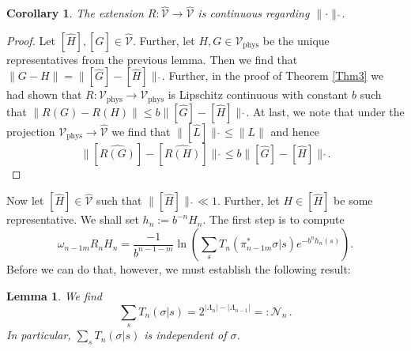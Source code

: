 \documentclass{article}
\newtheorem{lemma}[theorem]{Lemma}
\newtheorem{corollary}[theorem]{Corollary}
\newcommand{\phys}{\mathrm{phys}}
\begin{document}
\begin{corollary}
    The extension $R:\hat{\mathcal{V}}\to \hat{\mathcal{V}}$ is continuous regarding $\|\cdot\|\hat{\,}$.
\end{corollary}

\begin{proof}
    Let $[\hat H],[\hat G]\in\hat{\mathcal{V}}$. Further, let $H,G\in \mathcal{V}_\phys$ be the unique representatives from the previous lemma. Then we find that $\|G-H\|=\|[\hat G]-[\hat H]\|\hat{\,}$. Further, in the proof of Theorem \ref{Thm3} we had shown that $R:\mathcal{V}_\phys\to \mathcal{V}_\phys$ is Lipschitz continuous with constant $b$ such that $\|R(G)-R(H)\|\leq b\|[\hat G]-[\hat H]\|\hat{\,}$. At last, we note that under the projection $\mathcal{V}_\phys\to \hat{\mathcal{V}}$ we find that $\|[\hat L]\|\hat{\,}\leq\|L\|$ and hence
    \begin{equation}
        \|[\hat{R(G)}]-[\hat{R(H)}]\|\hat{\,}\leq b\|[\hat G]-[\hat H]\|\hat{\,}.
    \end{equation}
\end{proof}

Now let $[\hat H]\in\hat{\mathcal{V}}$ such that $\|[\hat H]\|\hat{\,}\ll1$. Further, let $H\in[\hat H]$ be some representative. We shall set $h_n:=b^{-n}H_n$. The first step is to compute
\begin{equation}
    \omega_{n-1m}R_nH_n=\frac{-1}{b^{n-1-m}}\ln\left(\sum_sT_n(\pi_{n-1m}^*\sigma|s)e^{-b^nh_n(s)}\right).
\end{equation}
Before we can do that, however, we must establish the following result:

\begin{lemma}
    We find
    \begin{equation}
        \sum_sT_n(\sigma|s)=2^{|\Lambda_n|-|\Lambda_{n-1}|}=:\mathcal{N}_n\,.
    \end{equation}
    In particular, $\sum_sT_n(\sigma|s)$ is independent of $\sigma$.
\end{lemma}
\end{document}
